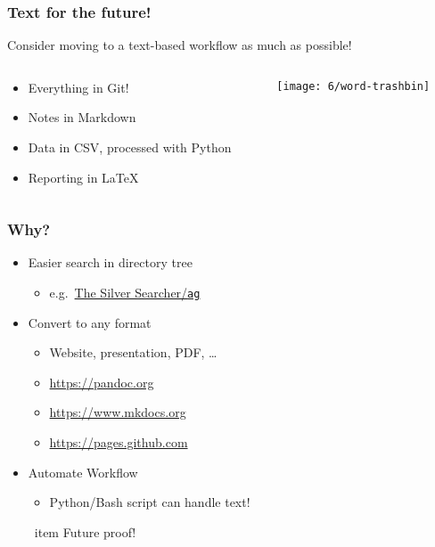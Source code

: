 \documentclass[aspectratio=169]{beamer}
\begin{document}
\begin{frame}
  \frametitle{Text for the future!}

 Consider moving to a text-based workflow as much as possible!

  \begin{columns}
    \begin{column}{.7\textwidth}
      \begin{itemize}
       \item Everything in Git!
       \item Notes in Markdown
       \item Data in CSV, processed with Python
       \item Reporting in LaTeX
      \end{itemize}
    \end{column}

    \begin{column}{.3\textwidth}
      \texttt{[image: 6/word-trashbin]}
    \end{column}
  \end{columns}

  
\end{frame}

\begin{frame}
  \frametitle{Why?}

  \begin{itemize}
    \item Easier search in directory tree
    \begin{itemize}
        \item e.g.~\href{https://github.com/ggreer/the_silver_searcher}{The Silver Searcher/\texttt{ag}}
    \end{itemize}
    \item Convert to any format
    \begin{itemize}
        \item Website, presentation, PDF, \ldots
        \item \url{https://pandoc.org}
        \item \url{https://www.mkdocs.org}
        \item \url{https://pages.github.com}
    \end{itemize}
    \item Automate Workflow
    \begin{itemize}
        \item Python/Bash script can handle text!
    \end{itemize}
    \ item Future proof!
  \end{itemize}

\end{frame}
\end{document}
